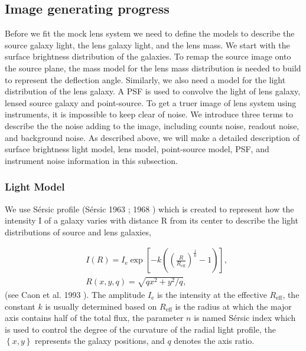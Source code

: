 \documentclass[a4paper,11pt]{article}
\begin{document}
\subsection{Image generating progress}

Before we fit the mock lens system we need to define the models to describe the source galaxy light, the lens galaxy light, and the lens mass. We start with the surface brightness distribution of the galaxies. To remap the source image onto the source plane, the mass model for the lens mass distribution is needed to build to represent the deflection angle. Similarly, we also need a model for the light distribution of the lens galaxy. A PSF is used to convolve the light of lens galaxy, lensed source galaxy and point-source. To get a truer image of lens system using instruments, it is impossible to keep clear of noise. We introduce three terms to describe the the noise adding to the image, including counts noise, readout noise, and background noise. As described above, we will make a detailed description of surface brightness light model, lens model, point-source model, PSF, and instrument noise information in this subsection.

\subsubsection{Light Model}

We use S\'ersic profile (S\'ersic 1963 \cite{1963BAAA....6...41S}; 1968 \cite{1968adga.book.....S}) which is created to represent how the intensity I of a galaxy varies with distance R from its center to describe the light distributions of source and lens galaxies,

\begin{eqnarray}
   \label{eq:Intensity}
   &I(R) = I_{\mathrm{e}} \exp\left[-k\left(\left(\frac{R}{R_{\mathrm{eff}}}\right)^{\frac{1}{\mathrm{n}}}-1\right)\right] ,\\
   &R(x,y,q) = \sqrt{qx^2+y^2/q},
\end{eqnarray}
(see Caon et al. 1993 \cite{1993MNRAS.265.1013C}). The amplitude $I_{\mathrm{e}}$ is the intensity at the effective $R_{\mathrm{eff}}$, the constant $k$ is usually determined based on $R_{\mathrm{eff}}$ is the radius at which the major axis contains half of the total flux, the parameter $n$ is named S\'ersic index which is used to control the degree of the curvature of the radial light profile, the $\left\{x,y\right\}$ represents the galaxy positions, and $q$ denotes the axis ratio.
\end{document}
